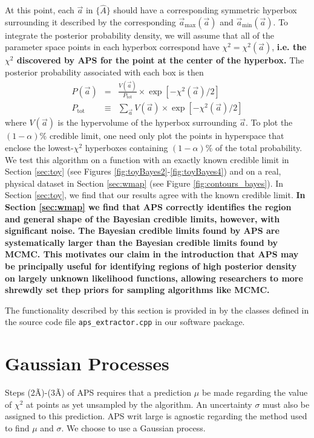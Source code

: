 \documentclass[useAMS,usenatbib]{aastex}
\newcommand{\APS}{APS }
\begin{document}
At this point, each $\vec{a}$ in $\{\hat{A}\}$ should have a corresponding symmetric hyperbox
surrounding it described by the corresponding 
$\vec{a}_\text{max}(\vec{a})$ and $\vec{a}_\text{min}(\vec{a})$.  
To integrate the posterior probability density, we will assume that all of the
parameter space points in each hyperbox correspond have $\chi^2=\chi^2(\vec{a})$,
{\bf %
i.e. the $\chi^2$ discovered by APS for the point at the center of the hyperbox.
} %
The posterior probability associated with each box is then
\begin{eqnarray}
P(\vec{a})&=&\frac{V(\vec{a})}{P_\text{tot}}\times\exp\left[-\chi^2(\vec{a})/2\right]
\label{eqn:posterior}\\
P_\text{tot}&\equiv&\sum_{\vec{a}} V(\vec{a})\times\exp\left[-\chi^2(\vec{a})/2\right]
\end{eqnarray}
where $V(\vec{a})$ is the hypervolume of the hyperbox surrounding $\vec{a}$.
To plot the $(1-\alpha)\%$ credible limit, one need only plot the points in hyperspace that
enclose the lowest-$\chi^2$ hyperboxes containing $(1-\alpha)\%$ of the total probability.
We test this algorithm on a function with an exactly known credible limit
in Section \ref{sec:toy} (see Figures \ref{fig:toyBayes2}-\ref{fig:toyBayes4}) 
and on a real, physical dataset in Section \ref{sec:wmap} (see Figure \ref{fig:contours_bayes}).  
In  Section \ref{sec:toy}, we find that our results agree with the known credible limit.
{\bf %
In Section \ref{sec:wmap} we find that APS correctly identifies the region and general
shape of the Bayesian credible limits, however, with significant noise.  The Bayesian
credible limits found by APS are systematically larger than the Bayesian credible
limits found by MCMC.  This motivates our claim in the introduction that APS may be
principally useful for identifying regions of high posterior density on largely unknown
likelihood functions, allowing researchers to more shrewdly set thep priors for sampling
algorithms like MCMC.
}%

The functionality described by this section is provided in by the classes defined in the source
code file \verb|aps_extractor.cpp| in our software package.


\section{Gaussian Processes}
\label{sec:gp}

Steps (2\~A)-(3\~A) of \APS requires that a prediction $\mu$ be made regarding the value
of $\chi^2$ at points as yet unsampled by the algorithm.  An uncertainty $\sigma$
must also be assigned to this prediction.  APS writ large is agnostic regarding
the method used to find $\mu$ and $\sigma$.  We choose to use a Gaussian process.
\end{document}
